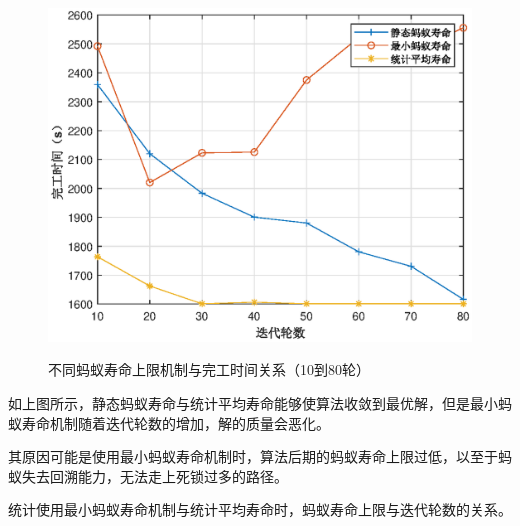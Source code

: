 \begin{figure}[H]
	\centering
	\includegraphics[scale=1.00,angle=0]{figures/test3.eps}\\
	\caption{不同蚂蚁寿命上限机制与完工时间关系（10到80轮）}
\end{figure}

如上图所示，静态蚂蚁寿命与统计平均寿命能够使算法收敛到最优解，但是最小蚂蚁寿命机制随着迭代轮数的增加，解的质量会恶化。

其原因可能是使用最小蚂蚁寿命机制时，算法后期的蚂蚁寿命上限过低，以至于蚂蚁失去回溯能力，无法走上死锁过多的路径。

统计使用最小蚂蚁寿命机制与统计平均寿命时，蚂蚁寿命上限与迭代轮数的关系。

\begin{table}[H]
	\centering
	\caption{各寿命上限机制与寿命上限与迭代轮数关系}
\end{table}

